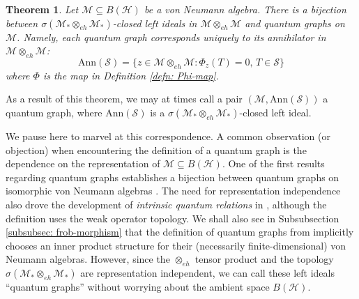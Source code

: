 \documentclass[12pt]{article}
\newtheorem{theorem}{Theorem}[section]
\theoremstyle{definition}
\newenvironment{remark}
  {\pushQED{\qed}\renewcommand{\qedsymbol}{\textcircled{\tiny R}}\remarkx}
  {\popQED\endremarkx}
\newcommand{\mc}[1]{\mathcal{#1}}
\newcommand{\<}{\langle}
\renewcommand{\>}{\rangle}
\newcommand{\Ann}{\text{Ann}}
\renewcommand{\subset}{\subseteq}
\newcommand{\eh}{\otimes_{eh}}
\begin{document}
\begin{theorem} \label{thm: gp-bijection}
    Let $\mc M \subset B(\mc H)$ be a von Neumann algebra. There is a bijection between $\sigma(\mc M_* \eh \mc M_*)$-closed left ideals in $\mc M \eh \mc M$ and quantum graphs on $\mc M$. Namely, each quantum graph corresponds uniquely to its annihilator in $\mc M \eh \mc M$:
    \[
    \Ann(\mc S) = \{z \in \mc M \otimes_{eh} \mc M : \Phi_z(T) = 0, \, T \in \mc S\}
    \]
    where $\Phi$ is the map in Definition \ref{defn: Phi-map}.
\end{theorem}

As a result of this theorem, we may at times call a pair $(\mc M, \Ann(\mc S))$ a quantum graph, where $\Ann(\mc S)$ is a $\sigma(\mc M_* \eh \mc M_*)$-closed left ideal. 

\begin{remark}
We pause here to marvel at this correspondence. A common observation (or objection) when encountering the definition of a quantum graph is the dependence on the representation of $\mc M \subset B(\mc H)$. One of the first results \cite[Theorem 2.7]{weaverqrelations} regarding quantum graphs establishes a bijection between quantum graphs on isomorphic von Neumann algebras \cite[Theorem 2.7]{weaverqrelations}. The need for representation independence also drove the development of \textit{intrinsic quantum relations} in \cite[Definition 2.24]{weaverqrelations}, although the definition uses the weak operator topology. We shall also see in Subsubsection \ref{subsubsec: frob-morphism} that the definition of quantum graphs from \cite{musto-reutter-verdon} implicitly chooses an inner product structure for their (necessarily finite-dimensional) von Neumann algebras. However, since the $\eh$ tensor product and the topology $\sigma(\mc M_* \eh \mc M_*)$ are representation independent, we can call these left ideals ``quantum graphs'' without worrying about the ambient space $B(\mc H)$.
\end{remark}
\end{document}
